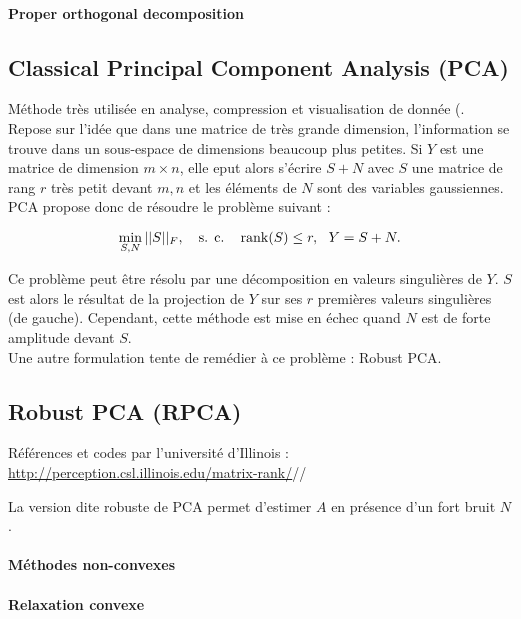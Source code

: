 \paragraph{\tbullet  Proper orthogonal decomposition}

\subsection{Classical Principal Component Analysis (PCA)}
Méthode très utilisée en analyse, compression et visualisation de donnée (. Repose sur l'idée que dans une matrice de très grande dimension, l'information  se trouve dans un sous-espace de dimensions beaucoup plus petites. Si $Y$ est une matrice de dimension $m \times n$, elle eput alors s'écrire $S + N$ avec $S$ une matrice de rang $r$ très petit devant $m,n$ et les éléments de $N$ sont des variables gaussiennes. PCA propose donc de résoudre le problème suivant : 

\begin{equation}
    \min_{S,N} || S ||_F, ~~~\text{s. c.~~~} \operatorname{rank}(S) \le r ,~~Y=S+N.
\end{equation}

Ce problème peut être résolu par une décomposition en valeurs singulières de $Y$. $S$ est alors le résultat de la projection de $Y$ sur ses $r$ premières valeurs singulières (de gauche).
Cependant, cette méthode est mise en échec quand $N$ est de forte amplitude devant $S$. \\
Une autre formulation tente de remédier à ce problème : Robust PCA.

\subsection{Robust PCA (RPCA)}
Références et codes par l'université d'Illinois : \url{http://perception.csl.illinois.edu/matrix-rank/}//

La version dite robuste de PCA permet d'estimer $A$ en présence d'un fort bruit $N$.

\paragraph{\tbullet Méthodes non-convexes}


\paragraph{\tbullet Relaxation convexe}

